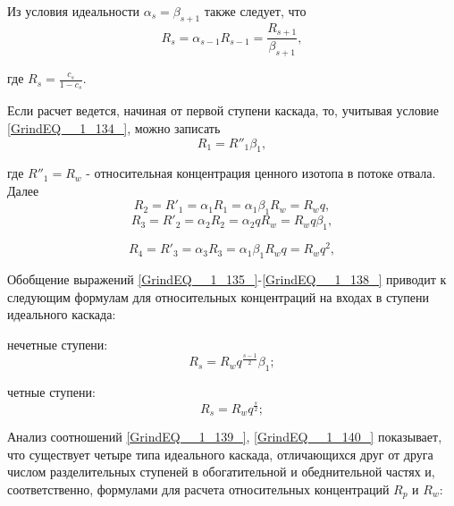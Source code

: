 Из условия идеальности $\alpha _{s} =\beta _{s+1} $ также следует, что
\begin{equation} \label{GrindEQ__1_134_} 
R_{s} =\alpha _{s-1} R_{s-1} =\frac{R_{s+1} }{\beta _{s+1} } ,                              
\end{equation} 

где   $R_{s} =\frac{c_{s} }{1-c_{s} } $.

Если расчет ведется, начиная от первой ступени каскада, то, учитывая условие \ref{GrindEQ__1_134_}, можно записать
\begin{equation} \label{GrindEQ__1_135_} 
R_{1} =R''_{1} \beta _{1} ,          
\end{equation} 

где $R''_{1} =R_{w} $ - относительная концентрация ценного изотопа в потоке отвала. Далее
\begin{equation} \label{GrindEQ__1_136_} 
R_{2} =R'_{1} =\alpha _{1} R_{1} =\alpha _{1} \beta _{1} R_{w} =R_{w} q,  
\end{equation} 
\begin{equation} \label{GrindEQ__1_137_} 
R_{3} =R'_{2} =\alpha _{2} R_{2} =\alpha _{2} qR_{w} =R_{w} q\beta _{1} ,  
\end{equation} 

\begin{equation} \label{GrindEQ__1_138_} 
    R_{4} =R'_{3} =\alpha _{3} R_{3} =\alpha _{1} \beta _{1} R_{w} q=R_{w} q^{2},  
\end{equation} 


Обобщение выражений \ref{GrindEQ__1_135_}-\ref{GrindEQ__1_138_} приводит к следующим формулам для относительных концентраций на входах в ступени идеального каскада:

нечетные ступени:
\begin{equation} \label{GrindEQ__1_139_} 
    R_{s} =R_{w} q^{\frac{s-1}{2} } \beta _{1}; 
\end{equation} 

четные ступени:
\begin{equation} \label{GrindEQ__1_140_} 
    R_{s} =R_{w} q^{\frac{s}{2} }; 
\end{equation} 

Анализ соотношений \ref{GrindEQ__1_139_}, \ref{GrindEQ__1_140_} показывает, что существует четыре типа идеального каскада, отличающихся друг от друга числом разделительных ступеней в обогатительной и обеднительной частях и, соответственно, формулами для расчета относительных концентраций $R_{p} $ и $R_{w} $:

